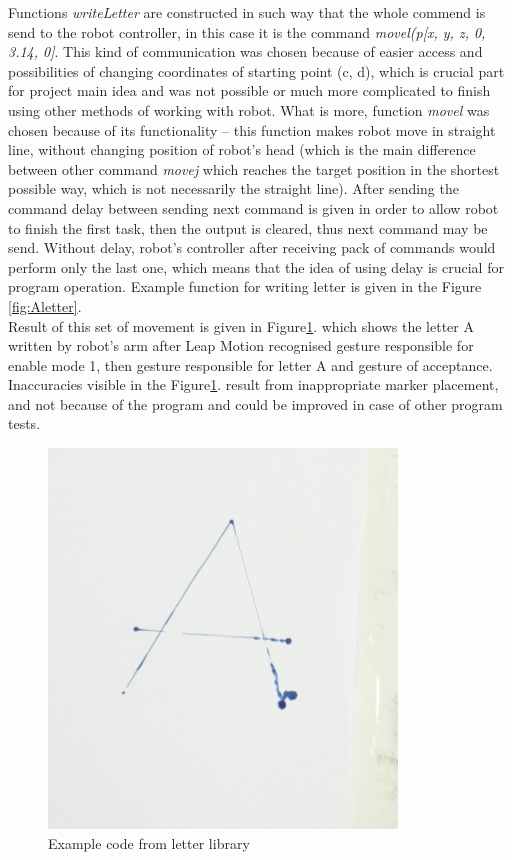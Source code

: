 Functions \textit{writeLetter} are constructed in such way that the whole commend is send to the robot controller, in this case it is the command \textit{movel(p[x, y, z, 0, 3.14, 0]}. This kind of communication was chosen because of easier access and possibilities of changing coordinates of starting point (c, d), which is crucial part for project main idea and was not possible or much more complicated to finish using other methods of working with robot. What is more, function \textit{movel} was chosen because of its functionality – this function makes robot move in straight line, without changing position of robot’s head (which is the main difference between other command \textit{movej} which reaches the target position in the shortest possible way, which is not necessarily the straight line). After sending the command delay between sending next command is given in order to allow robot to finish the first task, then the output is cleared, thus next command may be send. Without delay, robot’s controller after receiving pack of commands would perform only the last one, which means that the idea of using delay is crucial for program operation.  Example function for writing letter is given in the Figure \ref{fig:Aletter}. \\

Result of this set of movement is given in Figure\ref{fig:letter}. which shows the letter A written by robot’s arm after Leap Motion recognised gesture responsible for enable mode 1, then gesture responsible for letter A and gesture of acceptance. Inaccuracies visible in the Figure\ref{fig:letter}. result from inappropriate marker placement, and not because of the program and could be improved in case of other program tests. \\

\begin{figure}[H]
	\includegraphics{Letter}
	\centering
	\caption{Example code from letter library}
	\label{fig:letter}
\end{figure}

